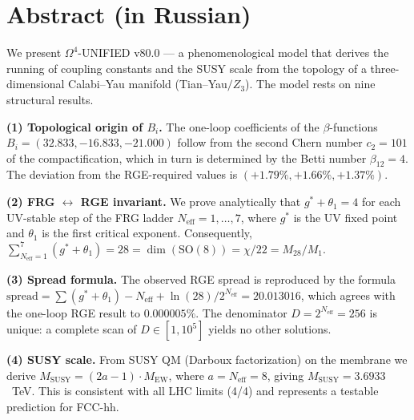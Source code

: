 \documentclass[11pt,a4paper]{article}
\theoremstyle{definition}
\begin{document}
\begin{abstract}
\medskip\noindent
\textbf{Keywords.}
Calabi--Yau, $\mathrm{SU}(26)$, $\beta$-functions, functional renormalization
group, asymptotic safety, SUSY QM, Darboux factorization,
$M_{\text{SUSY}}$, LHC, FCC-hh.
\end{abstract}

\section*{Abstract (in Russian)}

\noindent
We present $\Omega^4$-UNIFIED v80.0 --- a phenomenological model
that derives the running of coupling constants and the SUSY scale
from the topology of a three-dimensional Calabi--Yau manifold
(Tian--Yau$/Z_3$). The model rests on nine structural results.

\medskip\noindent
\textbf{(1) Topological origin of $B_i$.}
The one-loop coefficients of the $\beta$-functions
$B_i = (32.833, -16.833, -21.000)$ follow from the second Chern number
$c_2 = 101$ of the compactification, which in turn is determined
by the Betti number $\beta_{12} = 4$. The deviation from the RGE-required
values is $(+1.79\%, +1.66\%, +1.37\%)$.

\medskip\noindent
\textbf{(2) FRG $\leftrightarrow$ RGE invariant.}
We prove analytically that $g^* + \theta_1 = 4$ for each
UV-stable step of the FRG ladder $N_{\text{eff}} = 1, \ldots, 7$,
where $g^*$ is the UV fixed point and $\theta_1$ is the
first critical exponent.
Consequently,
$\sum_{N_{\text{eff}}=1}^{7} (g^* + \theta_1) = 28
= \dim(\mathrm{SO}(8)) = \chi/22 = M_{28}/M_1$.

\medskip\noindent
\textbf{(3) Spread formula.}
The observed RGE spread is reproduced by the formula
$\text{spread} = \sum(g^*+\theta_1) - N_{\text{eff}}
+ \ln(28)/2^{N_{\text{eff}}} = 20.013016$,
which agrees with the one-loop RGE result to
$0.000005\%$. The denominator $D = 2^{N_{\text{eff}}} = 256$ is unique:
a complete scan of $D \in [1, 10^5]$ yields no other solutions.

\medskip\noindent
\textbf{(4) SUSY scale.}
From SUSY QM (Darboux factorization) on the membrane we derive
$M_{\text{SUSY}} = (2a - 1) \cdot M_{\text{EW}}$, where
$a = N_{\text{eff}} = 8$, giving $M_{\text{SUSY}} = 3.6933$~TeV.
This is consistent with all LHC limits (4/4) and represents
a testable prediction for FCC-hh.
\end{document}

